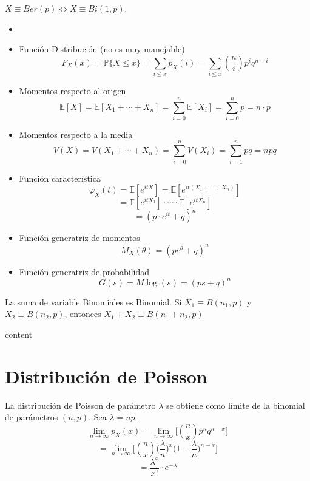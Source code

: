 \begin{obs}
  $X \equiv Ber(p) \Leftrightarrow X \equiv Bi(1, p)$.
\end{obs}

\begin{prop}
  \begin{itemize}
    \item []
    \item Función Distribución (no es muy manejable)
      \[ 
        F_{X}(x) = \mathbb{P} \{ X \leq x \} = \sum_{i \leq x} p_{X}(i) = \sum_{i \leq x} \binom{n}{i} p ^{i} q^{n - i}
      \] 
    \item Momentos respecto al origen
      \[ 
        \mathbb{E} [ X ] = \mathbb{E} [ X_{1} + \cdots + X_{n} ] = \sum_{i = 0}^{n} \mathbb{E} [ X_{i} ] = \sum_{i = 0}^{n} p = n \cdot p 
      \] 
    \item Momentos respecto a la media
      \[ 
        V(X) = V(X_{1} + \cdots + X_{n}) = \sum_{i = 0}^{n} V(X_{i}) = \sum_{i = 1}^{n} pq = npq 
      \] 
    \item Función característica
      \[ 
        \varphi_{X}(t) = \mathbb{E} [ e^{itX} ] = \mathbb{E} [ e^{it(X_{1} + \cdots + X_{n})} ]
      \] 
      \[ 
        = \mathbb{E} [ e^{it X_{1}} ] \cdot \cdots \cdot \mathbb{E} [ e^{it X_{n}} ]
      \] 
      \[ 
        = (p \cdot e^{it} + q)^{n}
      \] 
    \item Función generatriz de momentos
      \[ 
        M_{X}(\theta) = (p e^{\theta} + q)^{n} 
      \] 
    \item Función generatriz de probabilidad
      \[ 
        G(s) = M \log (s) = (ps + q)^{n} 
      \] 
  \end{itemize}
\end{prop}

\begin{theo}
  La suma de variable Binomiales es Binomial. Si $X_{1} \equiv B(n_{1}, p)$ y $X_{2} \equiv B(n_{2}, p)$, entonces $X_{1} + X_{2} \equiv B(n_{1} + n_{2}, p)$
\end{theo}

\begin{dem}
  content
\end{dem}

\section{Distribución de Poisson}

La distribución de Poisson de parámetro $\lambda$ se obtiene como límite de la binomial de parámetros $(n, p)$. Sea $\lambda = np$.
\[ 
  \lim_{n \to \infty} p_{X}(x) = \lim_{n \to \infty} \Bigg [ \binom{n}{x}p ^{n} q^{n - x} \Bigg ]
\] 
\[ 
  = \lim_{n \to \infty} \Big [ \binom{n}{x} \Big ( \frac{\lambda}{n} \Big )^{x} \Big ( 1 - \frac{\lambda}{n} \Big )^{n-x} \Big ]  
\] 
\[ 
  = \frac{\lambda^{x}}{x!} \cdot e^{-\lambda} 
\] 


